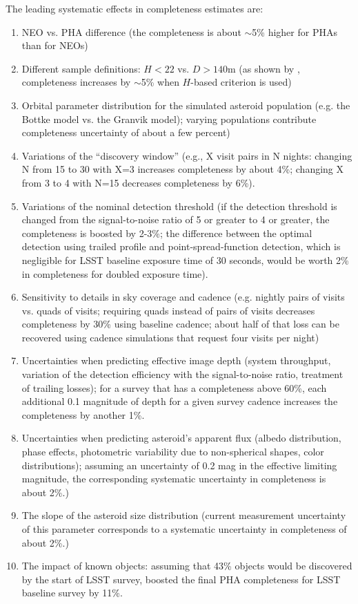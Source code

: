 The leading systematic effects in completeness estimates are: 
\begin{enumerate}
\item NEO vs. PHA difference (the completeness is about $\sim$5\% higher for PHAs than for NEOs) 
\item Different sample definitions: $H<22$ vs. $D>140$m (as shown by \citep{GMS2016}, completeness
           increases by $\sim$5\% when $H$-based criterion is used) 
\item Orbital parameter distribution for the simulated asteroid population (e.g. the Bottke model
             vs. the Granvik model); varying populations contribute completeness uncertainty of about a few percent) 
\item Variations of the ``discovery window'' (e.g., X visit pairs in N nights: changing N from 15 to 30 with X=3 increases
          completeness by about 4\%; changing X from 3 to 4 with N=15 decreases completeness by 6\%). 
\item Variations of the nominal detection threshold (if the detection threshold is changed from the 
          signal-to-noise ratio of 5 or greater to 4 or greater, the completeness is boosted by 2-3\%; 
          the difference between the optimal detection using trailed profile and point-spread-function 
          detection, which is negligible for LSST baseline exposure time of 30 seconds, would be worth 2\%
          in completeness for doubled exposure time). 
\item Sensitivity to details in sky coverage and cadence (e.g. nightly pairs of visits vs. quads of visits;
          requiring quads instead of pairs of visits decreases completeness by 30\% using baseline cadence; 
          about half of that loss can be recovered using cadence simulations that request four visits per night) 
\item Uncertainties when predicting effective image depth (system throughput, variation of the detection efficiency
          with the signal-to-noise ratio, treatment of trailing losses); for a survey that has a completeness above 60\%, 
          each additional 0.1 magnitude of depth for a given survey cadence increases the completeness by another 1\%.
\item Uncertainties when predicting asteroid's apparent flux (albedo distribution, phase effects, photometric variability 
          due to non-spherical shapes, color distributions); assuming an uncertainty of 0.2 mag in the effective 
          limiting magnitude, the corresponding  systematic uncertainty in completeness is about 2\%.)
\item The slope of the asteroid size distribution (current measurement uncertainty of this parameter 
          corresponds to a systematic uncertainty in completeness of about 2\%.)
\item The impact of known objects: assuming that 43\% objects would be discovered by the start of
          LSST survey, \cite{GMS2016} boosted the final PHA completeness for LSST baseline survey by 11\%. 
\end{enumerate} 

